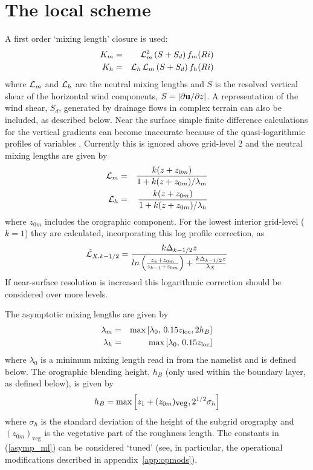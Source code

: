 \documentclass{UMDP_article}
\begin{document}
\section{The local scheme}
\label{sec:local}

A first order `mixing length' closure is used:
\begin{eqnarray}
  K_m &=& {\cal L}_m^2 \, (S+S_d) \, f_m(Ri) \label{kmlocal}\\
  K_h &=& {\cal L}_h \, {\cal L}_m \, 
          (S+S_d) \, f_h(Ri) \label{khlocal}
\end{eqnarray}
where ${\cal L}_m$ and ${\cal L}_h$ are the neutral mixing lengths and
$S$ is the resolved vertical shear of the horizontal wind components,
$S = \left| \partial {\bf u}/\partial z \right|$.  A representation of
the wind shear, $S_d$, generated by drainage flows in complex terrain
can also be included, as described below.  Near the surface simple
finite difference calculations for the vertical gradients can become
inaccurate because of the quasi-logarithmic profiles of variables
\cite[]{Ayra1991}.  Currently this is ignored above grid-level 2 and
the neutral mixing lengths are given by
\begin{eqnarray*}
  {\cal L}_m &=& \frac{k(z+z_{0m})}{1+k(z+z_{0m})/\lambda_m} \\
  {\cal L}_h &=& \frac{k(z+z_{0m})}{1+k(z+z_{0m})/\lambda_h} 
\end{eqnarray*}
where $z_{0m}$ includes the orographic component.  For the lowest
interior grid-level ($k=1$) they are calculated, incorporating this
log profile correction, as
\begin{equation*}
  \tilde{{\cal L}}_{X,k-1/2} = \frac{k \Delta_{k-1/2} z}{ 
    ln\left( \frac{z_k + z_{0m}}{z_{k-1} + z_{0m}} \right) 
    + \frac{k \Delta_{k-1/2} z}{\lambda_X} }
\end{equation*}
If near-surface resolution is increased this logarithmic correction
should be considered over more levels.

The asymptotic mixing lengths are given by 
\begin{eqnarray}
  \lambda_m &=&\mbox{max}\left[\lambda_0,\, 0.15 z_{\rm loc}, 2 h_B \right] \nonumber\\
  \lambda_h &=&\mbox{max}\left[\lambda_0,\, 0.15 z_{\rm loc} \right]
  \label{asymp_ml}
\end{eqnarray}
where $\lambda_0$ is a minimum mixing length read in from the namelist 
and \zloc is defined below.  The orographic blending height, $h_B$ (only 
used within the boundary layer, as defined below), is given by
\begin{equation*}
  h_B = {\rm max}\left[z_1+(z_{0m})_{\mbox{veg}}, 2^{1/2} \sigma_h \right]
\end{equation*}
where $\sigma_h$ is the standard deviation of the height of the
subgrid orography and $(z_{0m})_{\mbox{veg}}$ is the vegetative part
of the roughness length.  The constants in (\ref{asymp_ml}) can be
considered `tuned' (see, in particular, the operational modifications
described in appendix~\ref{app:opmods}).
\end{document}

